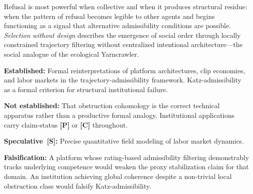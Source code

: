 \claimP Refusal is most powerful when collective and when it produces structural
residue: when the pattern of refusal becomes legible to other agents and begins
functioning as a signal that alternative admissibility conditions are possible.
\emph{Selection without design} describes the emergence of social order through
locally constrained trajectory filtering without centralized intentional
architecture---the social analogue of the ecological Yarncrawler.

\begin{constraintboundary}
\textbf{Established:} Formal reinterpretations of platform architectures, clip
economies, and labor markets in the trajectory-admissibility framework.
Katz-admissibility as a formal criterion for structural institutional failure.

\textbf{Not established:} That obstruction cohomology is the correct technical
apparatus rather than a productive formal analogy. Institutional applications
carry claim-status \textbf{[P]} or \textbf{[C]} throughout.

\textbf{Speculative~[S]:} Precise quantitative \RSVP field modeling of labor
market dynamics.

\textbf{Falsification:} A platform whose rating-based admissibility filtering
demonstrably tracks underlying competence would weaken the proxy stabilization
claim for that domain. An institution achieving global coherence despite a
non-trivial local obstruction class would falsify Katz-admissibility.
\end{constraintboundary}
